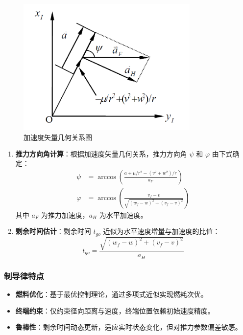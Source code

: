 \documentclass[12pt,a4paper]{article}
\begin{document}
\begin{figure}[htbp]
\centering
\includegraphics[width=0.8\textwidth]{figures/aF_aH_psi.png}
\caption{加速度矢量几何关系图}
\label{fig:a}
\end{figure}

\begin{enumerate}
    \item \textbf{推力方向角计算}：根据加速度矢量几何关系，推力方向角 \(\psi\) 和 \(\varphi\) 由下式确定：
    \begin{align}
        \psi &= \arccos\left( \frac{a + \mu/r^2 - (v^2 + w^2)/r}{a_F} \right) \\
        \varphi &= \arccos\left( \frac{v_f - v}{\sqrt{(w_f - w)^2 + (v_f - v)^2}} \right)
        \label{eq:control_angles}
    \end{align}
    其中 \(a_F\) 为推力加速度，\(a_H\) 为水平加速度。

    \item \textbf{剩余时间估计}：剩余时间 \(t_{go}\) 近似为水平速度增量与加速度的比值：
    \begin{equation}
        t_{go} = \frac{\sqrt{(w_f - w)^2 + (v_f - v)^2}}{a_H}
        \label{eq:time_to_go}
    \end{equation}
\end{enumerate}

\subsubsection{制导律特点}
\begin{itemize}
    \item \textbf{燃料优化}：基于最优控制理论，通过多项式近似实现燃耗次优。
    \item \textbf{终端约束}：仅约束径向距离与速度，终端位置依赖初始速度精度。
    \item \textbf{鲁棒性}：剩余时间动态更新，适应实时状态变化，但对推力参数偏差敏感。
\end{itemize}
\end{document}
